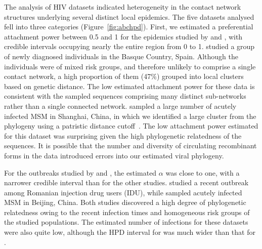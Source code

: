 The analysis of \gls{HIV} datasets indicated heterogeneity in the contact
network structures underlying several distinct local epidemics. The five
datasets analysed fell into three categories (Figure~\ref{fig:abchpd}). First,
we estimated a preferential attachment power between 0.5 and 1 for the
epidemics studied by \textcite{cuevas2009hiv} and \textcite{li2015hiv}, with
credible intervals occupying nearly the entire region from 0 to 1.
\citeauthor{cuevas2009hiv} studied a group of newly diagnosed individuals in
the Basque Country, Spain. Although the individuals were of mixed risk groups,
and therefore unlikely to comprise a single contact network, a high proportion
of them (47\%) grouped into local clusters based on genetic distance. The low
estimated attachment power for these data is consistent with the sampled
sequences comprising many distinct sub-networks rather than a single connected
network. \citeauthor{li2015hiv} sampled a large number of acutely infected MSM
in Shanghai, China, in which we identified a large cluster from the phylogeny
using a patristic distance cutoff~\autocite{poon2015impact}. The low attachment
power estimated for this dataset was surprising given the high phylogenetic
relatedness of the sequences. It is possible that the number and diversity of
circulating recombinant forms in the data introduced errors into our estimated
viral phylogeny.

For the outbreaks studied by \textcite{niculescu2015recent} and
\textcite{wang2015targeting}, the estimated $\alpha$ was close to one, with a
narrower credible interval than for the other studies.
\citeauthor{niculescu2015recent} studied a recent outbreak among Romanian
injection drug users (IDU), while \citeauthor{wang2015targeting} sampled
acutely infected MSM in Beijing, China. Both studies discovered a high degree
of phylogenetic relatedness owing to the recent infection times and homogeneous
risk groups of the studied populations. The estimated number of infections for
these datasets were also quite low, although the HPD interval for
\citeauthor{wang2015targeting} was much wider than that for
\citeauthor{niculescu2015recent}.

